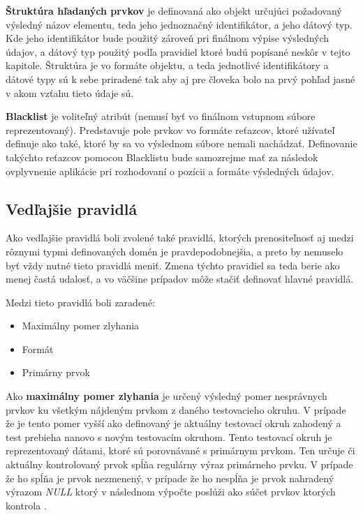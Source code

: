 \newpage

\textbf{Štruktúra hľadaných prvkov} je definovaná ako objekt určujúci požadovaný výsledný názov elementu, teda jeho jednoznačný identifikátor, a jeho  dátový typ. Kde jeho identifikátor bude použitý zároveň pri finálnom výpise výsledných údajov, a dátový typ použitý podľa pravidiel ktoré budú popísané neskôr v tejto kapitole. Štruktúra je vo formáte objektu, a teda jednotlivé identifikátory a dátové typy sú k sebe priradené tak aby aj pre človeka bolo na prvý pohľad jasné v akom vzťahu tieto údaje sú.

\bigskip

\textbf{Blacklist} je voliteľný atribút (nemusí byť vo finálnom vstupnom súbore reprezentovaný). Predstavuje pole prvkov vo formáte reťazcov, ktoré užívateľ definuje ako také, ktoré by sa vo výslednom súbore nemali nachádzať. Definovanie takýchto reťazcov pomocou Blacklistu bude samozrejme mať za následok ovplyvnenie aplikácie pri rozhodovaní o pozícii a formáte výsledných údajov. 


\subsection{Vedľajšie pravidlá}

Ako vedľajšie pravidlá boli zvolené také pravidlá, ktorých prenositeľnosť aj medzi rôznymi typmi definovaných domén je pravdepodobnejšia, a preto by nemuselo byť vždy nutné tieto pravidlá meniť. Zmena týchto pravidiel sa teda berie ako menej častá udalosť, a vo väčšine prípadov môže stačiť definovať hlavné pravidlá. 

Medzi tieto pravidlá boli zaradené:
\begin{itemize}
    \item {Maximálny pomer zlyhania}
    \item {Formát}
    \item {Primárny prvok}
\end{itemize}

\bigskip

Ako \textbf{maximálny pomer zlyhania} je určený výsledný pomer nesprávnych prvkov ku všetkým nájdeným prvkom z daného testovacieho okruhu. V prípade že je tento pomer vyšší ako definovaný je aktuálny testovací okruh zahodený a test prebieha nanovo s novým testovacím okruhom. Tento testovací okruh je reprezentovaný dátami, ktoré sú porovnávané s primárnym prvkom. Ten určuje či aktuálny kontrolovaný prvok spĺňa regulárny výraz primárneho prvku. V prípade že ho spĺňa je prvok nezmenený, v prípade že ho nespĺňa je prvok nahradený výrazom \textit{NULL} ktorý v následnom výpočte poslúži ako súčet prvkov ktorých kontrola . 

